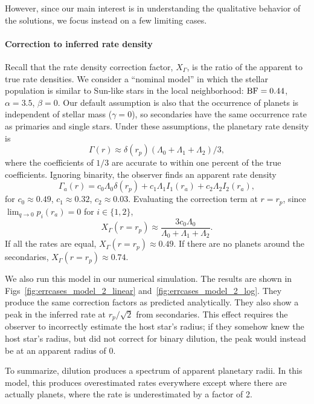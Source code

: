 However, since our main interest is in understanding the qualitative behavior 
of the solutions, we focus instead on a few limiting cases.


\paragraph{Correction to inferred rate density}
Recall that the rate density correction factor, $X_\Gamma$, is the ratio of 
the apparent to true rate densities.
We consider a ``nominal model'' in which the stellar population is similar to 
Sun-like stars in the local neighborhood:
${\rm BF}=0.44$, $\alpha=3.5$, $\beta=0$.
Our default assumption is also that the occurrence of planets is independent 
of stellar mass ($\gamma=0$), so secondaries have the same occurrence rate as 
primaries and single stars.
Under these assumptions, the planetary rate density is
\begin{equation}
\Gamma(r) \approx \delta(r_p) \left( \Lambda_0 + \Lambda_1 + 
\Lambda_2 \right) / 3,
\label{eq:model2_Gamma_r}
\end{equation}
where the coefficients of $1/3$ are accurate to within one percent of the true 
coefficients.
Ignoring binarity, the observer finds an apparent rate density
\begin{equation}
\Gamma_a(r) = c_0 \Lambda_0 \delta(r_p)
             +c_1 \Lambda_1 I_1(r_a)
             +c_2 \Lambda_2 I_2(r_a),
\label{eq:model2_Gamma_a_r}
\end{equation}
for $c_0\approx 0.49$, $c_1\approx 0.32$, $c_2\approx 0.03$.
Evaluating the correction term at $r=r_p$, since $\lim_{q\rightarrow0} 
p_i(r_a)=0$ for $i\in\{1,2\}$,
\begin{equation}
X_\Gamma(r=r_p) \approx \frac{3c_0 \Lambda_0}{\Lambda_0+\Lambda_1+\Lambda_2}.
\end{equation}
If all the rates are equal, $X_\Gamma(r=r_p)\approx0.49$.
If there are no planets around the secondaries, $X_\Gamma(r=r_p)\approx0.74$.

We also run this model in our numerical simulation.
The results are shown in Figs~\ref{fig:errcases_model_2_linear} 
and~\ref{fig:errcases_model_2_log}.
They produce the same correction factors as predicted analytically.
They also show a peak in the inferred rate at $r_p/\sqrt{2}$ from 
secondaries.
This effect requires the observer to incorrectly estimate the host star's 
radius; if they somehow knew the host star's radius, but did not correct for 
binary dilution, the peak would instead be at an apparent radius of 0.

To summarize, dilution produces a spectrum of apparent planetary radii. In 
this model, this produces overestimated rates everywhere except where there 
are actually planets, where the rate is underestimated by a factor of 2.